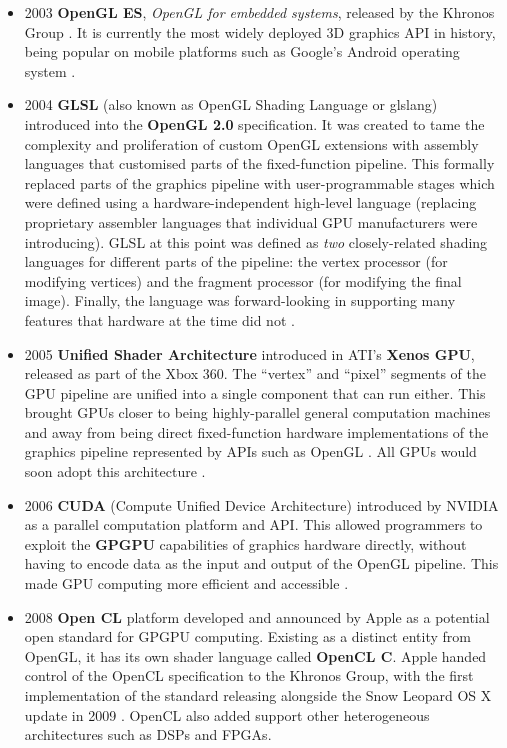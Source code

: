 \documentclass[a4paper,12pt,twoside,openright]{report}
\begin{document}
\begin{itemize}
    \item 2003 \textbf{OpenGL ES}, \textit{OpenGL for embedded systems},
    released by the Khronos Group \cite{OpenGLESRelease}. It is currently the
    most widely deployed 3D graphics API in history, being popular on mobile
    platforms such as Google's Android operating system \cite{OpenGLES}.

    \item 2004 \textbf{GLSL} (also known as OpenGL Shading Language or glslang)
    introduced into the \textbf{OpenGL 2.0} specification. It was created to
    tame the complexity and proliferation of custom OpenGL extensions with
    assembly languages that customised parts of the fixed-function pipeline.
    This formally replaced parts of the graphics pipeline with
    user-programmable stages which were defined using a hardware-independent
    high-level language (replacing proprietary assembler languages that
    individual GPU manufacturers were introducing). GLSL at this point was
    defined as \textit{two} closely-related shading languages for different
    parts of the pipeline: the vertex processor (for modifying vertices) and
    the fragment processor (for modifying the final image). Finally, the
    language was forward-looking in supporting many features that hardware at
    the time did not \cite{GLSL_1_10}.

    \item 2005 \textbf{Unified Shader Architecture} introduced in ATI's
    \textbf{Xenos GPU}, released as part of the Xbox 360. The ``vertex'' and
    ``pixel'' segments of the GPU pipeline are unified into a single component
    that can run either. This brought GPUs closer to being highly-parallel
    general computation machines and away from being direct fixed-function
    hardware implementations of the graphics pipeline represented by APIs such
    as OpenGL \cite{XenosDemystified}. All GPUs would soon adopt this
    architecture \cite{HistoryOfTheGPU}.

    \item 2006 \textbf{CUDA} (Compute Unified Device Architecture) introduced
    by NVIDIA as a parallel computation platform and API. This allowed
    programmers to exploit the \textbf{GPGPU} capabilities of graphics hardware
    directly, without having to encode data as the input and output of the
    OpenGL pipeline. This made GPU computing more efficient and accessible
    \cite{AboutCUDA}.

    \item 2008 \textbf{Open CL} platform developed and announced by Apple as a
    potential open standard for GPGPU computing. Existing as a distinct entity
    from OpenGL, it has its own shader language called \textbf{OpenCL C}. Apple
    handed control of the OpenCL specification to the Khronos Group, with the
    first implementation of the standard releasing alongside the Snow Leopard
    OS X update in 2009 \cite{OpenCL}. OpenCL also added support other
    heterogeneous architectures such as DSPs and FPGAs.


\end{itemize}
\end{document}
